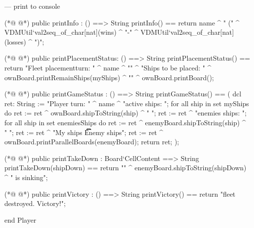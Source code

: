 \begin{vdmpp}[breaklines=true]
--- print to console
 
(*@
\label{printInfo:88}
@*)
 public printInfo : () ==> String
  printInfo() == return name ^ " (" ^ 
   VDMUtil`val2seq_of_char[nat](wins) ^ "-" ^ 
   VDMUtil`val2seq_of_char[nat](losses) ^ ")\n";
 
(*@
\label{printPlacementStatus:93}
@*)
 public printPlacementStatus: () ==> String
  printPlacementStatus() == return "Fleet placement\nPlayer turn: " ^ name ^ "\n" ^
  "Ships to be placed: " ^ ownBoard.printRemainShips(myShips) ^ "\n\n" ^
  ownBoard.printBoard();
  
(*@
\label{printGameStatus:98}
@*)
 public printGameStatus : () ==> String
  printGameStatus() == (
   dcl ret: String := "Player turn: " ^ name ^ "\nMy active ships: ";
   for all ship in set myShips do ret := ret ^ ownBoard.shipToString(ship) ^ "   ";
   ret := ret ^ "\nDestroyed enemies ships: ";
   for all ship in set enemiesShips do ret := ret ^ enemyBoard.shipToString(ship) ^ "   ";
   ret := ret ^ "\n\n                                 My ships \t\t\t\t\t\t\t\t\t                Enemy ships\n\n\n";
   ret := ret ^ ownBoard.printParallelBoards(enemyBoard);
   return ret;
  );
   
(*@
\label{printTakeDown:109}
@*)
 public printTakeDown : Board`CellContent ==> String
  printTakeDown(shipDown) == return "\n\n" ^ enemyBoard.shipToString(shipDown) ^ " is sinking\n";
  
(*@
\label{printVictory:112}
@*)
 public printVictory : () ==> String
  printVictory() == return "\nEnemy fleet destroyed. Victory!\n";

end Player
\end{vdmpp}
\bigskip
